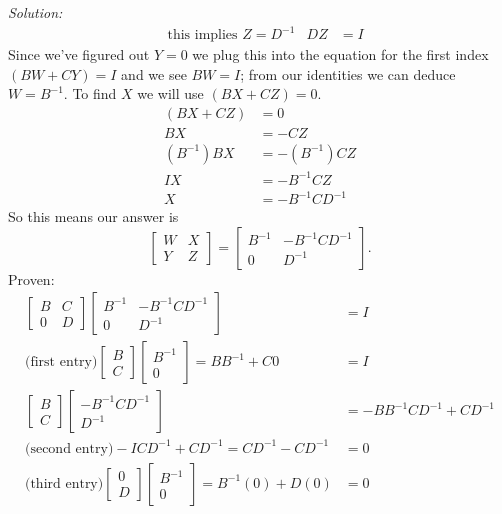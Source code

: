 \documentclass{article}
\newenvironment{solution}
    {\textit{Solution:}}
    {}
\begin{document}
\begin{solution}
\begin{align*}
    &\text{this implies $Z=D^{-1}$}& DZ &= I
\end{align*}
Since we've figured out $Y = 0$ we plug this into the equation for the first index $(BW+CY) = I$ and we see $BW=I$; from our identities we can deduce $W=B^{-1}$. To find $X$ we will use $(BX+CZ)=0$.
\begin{align*}
    (BX+CZ)&=0\\
    BX &= -CZ\\
    (B^{-1})BX &= -(B^{-1})CZ\\
    IX &= -B^{-1}CZ\\
    X &= -B^{-1}CD^{-1}
\end{align*}
So this means our answer is $$\begin{bmatrix} W & X \\ Y & Z \end{bmatrix} = \begin{bmatrix} B^{-1} & -B^{-1}CD^{-1} \\ 0 & D^{-1} \end{bmatrix}.$$ Proven:
\begin{align*}
    \begin{bmatrix} B & C \\ 0 & D \end{bmatrix}\begin{bmatrix} B^{-1} & -B^{-1}CD^{-1} \\ 0 & D^{-1}\end{bmatrix} &= I\\
    \text{(first entry)}\begin{bmatrix} B \\ C \end{bmatrix}\begin{bmatrix} B^{-1} \\ 0 \end{bmatrix} = BB^{-1} + C0 &= I\\
    \begin{bmatrix} B \\ C \end{bmatrix}\begin{bmatrix} -B^{-1}CD^{-1} \\ D^{-1} \end{bmatrix} &= -BB^{-1}CD^{-1} + CD^{-1}\\
    \text{(second entry)}-ICD^{-1} + CD^{-1} = CD^{-1} - CD^{-1} &= 0 \\
    \text{(third entry)}\begin{bmatrix} 0 \\ D \end{bmatrix}\begin{bmatrix} B^{-1} \\ 0 \end{bmatrix} = B^{-1}(0) + D(0) &= 0 \\

\end{align*}
\end{solution}
\end{document}
